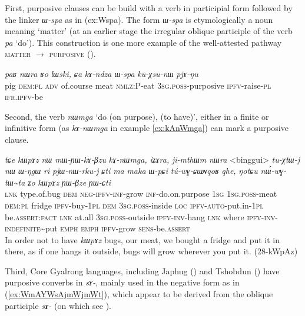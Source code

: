 \documentclass[oneside,a4paper,11pt]{article}
\newcommand{\ipa}[1]{\mbox{\phon\textit{#1}}} %
\begin{document}
   First, purposive clauses can be build with a verb in participial form followed by the linker \ipa{ɯ-spa} as in ({ex:Wspa}).  The form \ipa{ɯ-spa} is etymologically a noun meaning `matter' (at an earlier stage the irregular oblique participle of the verb \ipa{pa} `do'). This construction is one more example of the well-attested pathway \textsc{matter} $\rightarrow$ \textsc{purposive} (\citealt[212]{heine-kuteva02}).


\begin{exe}
\ex \label{ex:Wspa}
\gll \ipa{paʁ} 	\ipa{nɯra} 	\ipa{ʁo} 	\ipa{lɯski,} 	\ipa{ɕa} 	\ipa{kɤ-ndza} 	\ipa{ɯ-spa} 	\ipa{ku-χsu-nɯ} 	\ipa{pjɤ-ŋu}  \\
pig \textsc{dem:pl} \textsc{adv} of.course meat \textsc{nmlz}:P-eat \textsc{3sg.poss}-purposive \textsc{ipfv}-raise-\textsc{pl} \textsc{ifr.ipfv}-be \\
\glt 
\end{exe}
 
Second, the verb \ipa{nɯmga} `do (on purpose), (to have)', either in a finite or infinitive form (as \ipa{kɤ-nɯmga}  in example \ref{ex:kAnWmga}) can mark a purposive clause.

\begin{exe}
\ex \label{ex:kAnWmga}
\gll 
\ipa{tɕe} 	\ipa{kɯpɤz} 	\ipa{nɯ} 	\ipa{mɯ-ɲɯ-kɤ-βzu} 	\ipa{kɤ-nɯmga,} 	\ipa{iʑɤra,} \ipa{ji-mthɯm} 	\ipa{nɯra} 	<binggui> 	\ipa{tu-χtɯ-j} \ipa{nɯ} 	\ipa{ɯ-ŋgɯ} 	\ipa{ri} 	\ipa{pjɯ-nɯ-rku-j} 	\ipa{ɕti} 	\ipa{ma} \ipa{maka} 	\ipa{ɯ-pɕi} 	\ipa{tú-wɣ-ɕɯɴqoʁ} 	\ipa{qhe,} \ipa{ŋotɕu} 	\ipa{nɯ́-wɣ-tɯ\textasciitilde{}ta} 	\ipa{ʑo} 	\ipa{kɯpɤz} 	\ipa{ɲɯ-βze} 	\ipa{ɲɯ-ɕti}\\
\textsc{lnk} type.of.bug \textsc{dem} \textsc{neg-ipfv-inf}-grow \textsc{inf}-do.on.purpose \textsc{1sg} \textsc{1sg.poss}-meat \textsc{dem:pl} fridge \textsc{ipfv}-buy-\textsc{1pl} \textsc{dem} \textsc{3sg.poss}-inside \textsc{loc} \textsc{ipfv-auto}-put.in-\textsc{1pl} be.\textsc{assert:fact} \textsc{lnk} at.all \textsc{3sg.poss}-outside \textsc{ipfv-inv}-hang \textsc{lnk} where \textsc{ipfv-inv}-\textsc{indefinite}\textasciitilde{}put \textsc{emph} \textsc{emph} \textsc{ipfv}-grow \textsc{sens}-be.\textsc{assert}\\
\glt In order not to have \ipa{kɯpɤz} bugs, our meat, we bought a fridge and put it in there, as if one hangs it outside, bugs will grow wherever you put it. (28-kWpAz)
\end{exe}
 

Third, Core Gyalrong languages, including Japhug (\citealt{jacques14linking}) and Tshobdun (\citealt{sun12complementation}) have purposive converbs in \ipa{sɤ-}, mainly used in the negative form as in (\ref{ex:WmAYWsAjmWjmWt}), which appear to be derived from the oblique participle \ipa{sɤ-} (on which see \citealt{jacques16relatives}).
 
\end{document}
